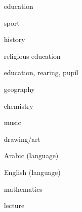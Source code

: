 

\begin{flashcard}{\LARGE education}
\LARGE {}
\end{flashcard}
\begin{flashcard}{\LARGE sport}
\LARGE {}
\end{flashcard}
\begin{flashcard}{\LARGE history}
\LARGE {}
\end{flashcard}
\begin{flashcard}{\LARGE religious education}
\LARGE {}
\end{flashcard}
\begin{flashcard}{\LARGE education, rearing, pupil}
\LARGE {}
\end{flashcard}
\begin{flashcard}{\LARGE geography}
\LARGE {}
\end{flashcard}
\begin{flashcard}{\LARGE chemistry}
\LARGE {}
\end{flashcard}
\begin{flashcard}{\LARGE music}
\LARGE {}
\end{flashcard}
\begin{flashcard}{\LARGE drawing/art}
\LARGE {}
\end{flashcard}
\begin{flashcard}{\LARGE Arabic (language)}
\LARGE {}
\end{flashcard}
\begin{flashcard}{\LARGE English (language)}
\LARGE {}
\end{flashcard}
\begin{flashcard}{\LARGE mathematics}
\LARGE {}
\end{flashcard}
\begin{flashcard}{\LARGE lecture}
\LARGE {}
\end{flashcard}
